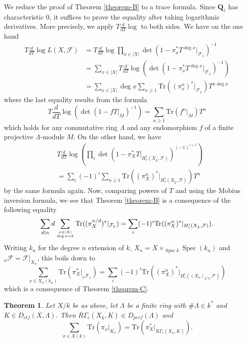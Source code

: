 \documentclass{stacks-project}
\theoremstyle{plain}
\newtheorem{theorem}[subsection]{Theorem}
\theoremstyle{definition}
\theoremstyle{remark}
\numberwithin{equation}{subsection}
\def\Spec{\mathop{\mathrm{Spec}}}
\begin{document}
\noindent
We reduce the proof of Theorem \ref{theorem-B} to a trace formula. Since
$\mathbf{Q}_\ell$ has characteristic 0, it suffices to prove the equality after
taking logarithmic derivatives. More precisely, we apply $T\frac{d}{dT} \log$
to both sides. We have on the one hand
\begin{align*}
T \frac{d}{dT} \log L(X, \mathcal{F})
& =
T\frac{d}{dT} \log
\prod_{x \in |X|} \det(1 - \pi_x^* T^{\deg x} |_{\mathcal{F}_{\bar x}})^{-1} \\
& =
\sum_{x \in |X|} T \frac{d}{dT} \log
( \det(1 - \pi_x^* T^{\deg x} |_{\mathcal{F}_{\bar x}})^{-1}) \\
& =
\sum_{x \in |X|} \deg x
\sum_{n \geq 1} \text{Tr}((\pi_x^n)^* |_{\mathcal{F}_{\bar x}}) T^{n\deg x}
\end{align*}
where the last equality results from the formula
$$
T\frac{d}{dT}\log\left(\det\left(1-fT|_M\right)^{-1}\right) = \sum_{n\geq 1}
\text{Tr}(f^n|_M)T^n
$$
which holds for any commutative ring $\Lambda$ and any endomorphism $f$ of a
finite projective $\Lambda$-module $M$. On the other hand, we have
\begin{align*}
& T\frac{d}{dT} \log\left(
\prod\nolimits_i
\det(1-\pi_X^*T |_{H_c^i\left(X_{\bar k} , \mathcal{F}\right)})^{(-1)^{i+1}}
\right) \\
& =
\sum\nolimits_i (-1)^i \sum\nolimits_{n \geq 1}
\text{Tr}\left((\pi_X^n)^* |_{H_c^i(X_{\bar k},\mathcal{F})}\right) T^n
\end{align*}
by the same formula again. Now, comparing powers of $T$ and using the Mobius
inversion formula, we see that Theorem \ref{theorem-B} is a consequence of the
following equality
$$
\sum_{d | n} d \sum_{x \in |X| \atop \deg x = d}
\text{Tr}((\pi_X^{n/d})^* |_{\mathcal{F}_{\bar x}}) =
\sum_i (-1)^i \text{Tr}((\pi^n_X)^* |_{H^i_c(X_{\bar k}, \mathcal{F})}).
$$
Writing $k_n$ for the degree $n$ extension of $k$,
$X_n = X \times_{\Spec k} \Spec(k_n)$ and
$_n\mathcal{F} = \mathcal{F}|_{X_n}$, this boils down
to
$$
\sum_{x \in X_n(k_n)} \text{Tr}(\pi_X^* |_{_n\mathcal{F}_{\bar x}})
=
\sum_i (-1)^i \text{Tr}((\pi^n_X)^* |_{H^i_c({(X_n)}_{\bar k}, _n\mathcal{F})})
$$
which is a consequence of Theorem \ref{theorem-C}.



\begin{theorem}
\label{theorem-D}
Let $X/k$ be as above, let $\Lambda$ be a finite ring with $\#\Lambda \in k^*$
and $K\in D_{ctf}(X, \Lambda)$. Then $R\Gamma_c(X_{\bar k}, K)\in
D_{perf}(\Lambda)$ and
$$
\sum_{x\in X(k)}\text{Tr}\left(\pi_x |_{K_{\bar x}}\right) =
\text{Tr}\left(\pi_X^* |_{R\Gamma_c(X_{\bar k}, K )}\right).
$$
\end{theorem}
\end{document}
